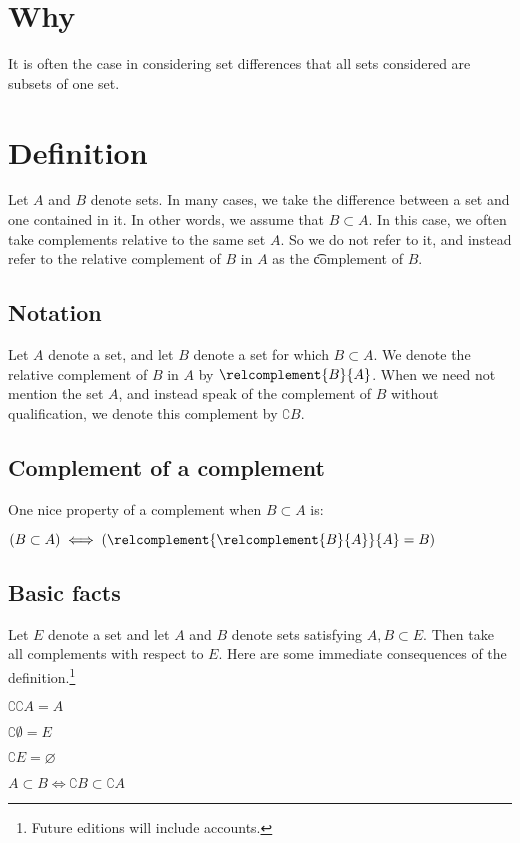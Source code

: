 
\section*{Why}

It is often the case in considering set differences that all sets considered are subsets of one set.

\section*{Definition}

Let $A$ and $B$ denote sets.
In many cases, we take the difference between a set and one contained in it.
In other words, we assume that $B \subset A$.
In this case, we often take complements relative to the same set $A$.
So we do not refer to it, and instead refer to the relative complement of $B$ in $A$ as the \t{complement} of $B$.

\subsection*{Notation}

Let $A$ denote a set, and let $B$ denote a set for which $B \subset A$.
We denote the relative complement of $B$ in $A$ by $\relcomplement{B}{A}$.
When we need not mention the set $A$, and instead speak of the complement of $B$ without qualification, we denote this complement by $\complement{B}$.

\subsection*{Complement of a complement}

One nice property of a complement when $B \subset A$ is:
\begin{proposition}
$(B \subset A) \iff (\relcomplement{\relcomplement{B}{A}}{A} = B)$
\end{proposition}


\subsection*{Basic facts}

Let $E$ denote a set and let $A$ and $B$ denote sets satisfying $A,B \subset E$.
Then take all complements with respect to $E$.
Here are some immediate consequences of the definition.\footnote{Future editions will include accounts.}

\begin{proposition}
$\complement{\complement{A}} = A$
\end{proposition}

\begin{proposition}
$\complement{\emptyset} = E$
\end{proposition}

\begin{proposition}
$\complement{E} = \varnothing$
\end{proposition}

\begin{proposition}
$A \subset B \iff \complement{B} \subset \complement{A}$
\end{proposition}
